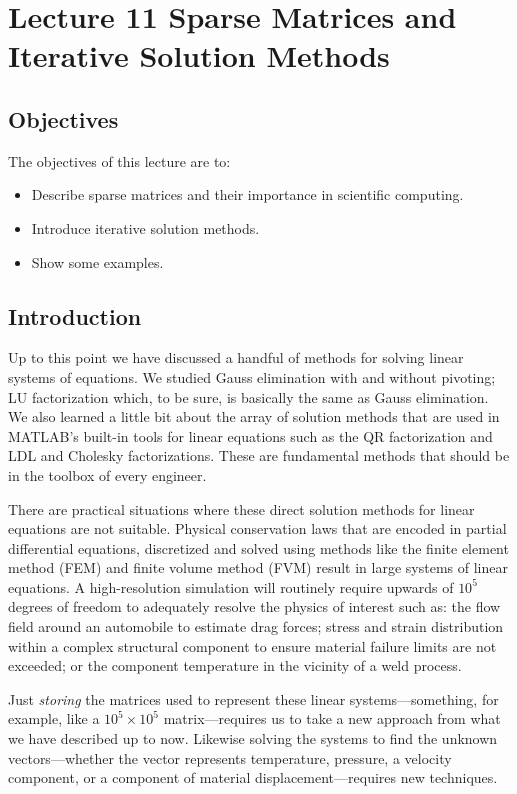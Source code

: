 \chapter{Lecture 11 Sparse Matrices and Iterative Solution Methods}
\label{ch:lec11n}
\section{Objectives}
The objectives of this lecture are to:
\begin{itemize}
\item Describe sparse matrices and their importance in scientific computing.
\item Introduce iterative solution methods.
\item Show some examples.
\end{itemize}
\setcounter{lstannotation}{0}

\section{Introduction}
Up to this point we have discussed a handful of methods for solving linear systems of equations.  We studied Gauss elimination with and without pivoting; LU factorization which, to be sure, is basically the same as Gauss elimination.  We also learned a little bit about the array of solution methods that are used in MATLAB's built-in tools for linear equations such as the QR factorization and LDL and Cholesky factorizations.  These are fundamental methods that should be in the toolbox of every engineer.

There are practical situations where these direct solution methods for linear equations are not suitable.  Physical conservation laws that are encoded in partial differential equations, discretized and solved using methods like the finite element method (FEM) and finite volume method (FVM) result in large systems of linear equations.  A high-resolution simulation will routinely require upwards of $10^5$ degrees of freedom to adequately resolve the physics of interest such as: the flow field around an automobile to estimate drag forces; stress and strain distribution within a complex structural component to ensure material failure limits are not exceeded; or the component temperature in the vicinity of a weld process.

Just \emph{storing} the matrices used to represent these linear systems---something, for example, like a $10^5 \times 10^5$ matrix---requires us to take a new approach from what we have described up to now.  Likewise solving the systems to find the unknown vectors---whether the vector represents temperature, pressure, a velocity component, or a component of material displacement---requires new techniques.

